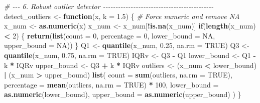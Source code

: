 \documentclass[
]{article}
\newenvironment{Shaded}{\begin{snugshade}}{\end{snugshade}}
\newcommand{\AttributeTok}[1]{\textcolor[rgb]{0.13,0.29,0.53}{#1}}
\newcommand{\CommentTok}[1]{\textcolor[rgb]{0.56,0.35,0.01}{\textit{#1}}}
\newcommand{\ConstantTok}[1]{\textcolor[rgb]{0.56,0.35,0.01}{#1}}
\newcommand{\ControlFlowTok}[1]{\textcolor[rgb]{0.13,0.29,0.53}{\textbf{#1}}}
\newcommand{\DecValTok}[1]{\textcolor[rgb]{0.00,0.00,0.81}{#1}}
\newcommand{\FloatTok}[1]{\textcolor[rgb]{0.00,0.00,0.81}{#1}}
\newcommand{\FunctionTok}[1]{\textcolor[rgb]{0.13,0.29,0.53}{\textbf{#1}}}
\newcommand{\NormalTok}[1]{#1}
\newcommand{\OtherTok}[1]{\textcolor[rgb]{0.56,0.35,0.01}{#1}}
\newcommand{\SpecialCharTok}[1]{\textcolor[rgb]{0.81,0.36,0.00}{\textbf{#1}}}
\begin{document}
\begin{Shaded}
\begin{Highlighting}[]
\CommentTok{\# {-}{-}{-} 6. Robust outlier detector {-}{-}{-}{-}{-}{-}{-}{-}{-}{-}{-}{-}{-}{-}{-}{-}{-}{-}{-}{-}{-}{-}{-}{-}{-}{-}{-}{-}{-}{-}{-}{-}{-}{-}{-}{-}{-}{-}{-}{-}{-}{-}{-}{-}}
\NormalTok{detect\_outliers }\OtherTok{\textless{}{-}} \ControlFlowTok{function}\NormalTok{(x, }\AttributeTok{k =} \FloatTok{1.5}\NormalTok{) \{}
  \CommentTok{\# Force numeric and remove NA}
\NormalTok{  x\_num }\OtherTok{\textless{}{-}} \FunctionTok{as.numeric}\NormalTok{(x)}
\NormalTok{  x\_num }\OtherTok{\textless{}{-}}\NormalTok{ x\_num[}\SpecialCharTok{!}\FunctionTok{is.na}\NormalTok{(x\_num)]}
  \ControlFlowTok{if}\NormalTok{(}\FunctionTok{length}\NormalTok{(x\_num) }\SpecialCharTok{\textless{}} \DecValTok{2}\NormalTok{) \{}
    \FunctionTok{return}\NormalTok{(}\FunctionTok{list}\NormalTok{(}\AttributeTok{count =} \DecValTok{0}\NormalTok{, }\AttributeTok{percentage =} \DecValTok{0}\NormalTok{, }\AttributeTok{lower\_bound =} \ConstantTok{NA}\NormalTok{, }\AttributeTok{upper\_bound =} \ConstantTok{NA}\NormalTok{))}
\NormalTok{  \}}
\NormalTok{  Q1 }\OtherTok{\textless{}{-}} \FunctionTok{quantile}\NormalTok{(x\_num, }\FloatTok{0.25}\NormalTok{, }\AttributeTok{na.rm =} \ConstantTok{TRUE}\NormalTok{)}
\NormalTok{  Q3 }\OtherTok{\textless{}{-}} \FunctionTok{quantile}\NormalTok{(x\_num, }\FloatTok{0.75}\NormalTok{, }\AttributeTok{na.rm =} \ConstantTok{TRUE}\NormalTok{)}
\NormalTok{  IQRv }\OtherTok{\textless{}{-}}\NormalTok{ Q3 }\SpecialCharTok{{-}}\NormalTok{ Q1}
\NormalTok{  lower\_bound }\OtherTok{\textless{}{-}}\NormalTok{ Q1 }\SpecialCharTok{{-}}\NormalTok{ k }\SpecialCharTok{*}\NormalTok{ IQRv}
\NormalTok{  upper\_bound }\OtherTok{\textless{}{-}}\NormalTok{ Q3 }\SpecialCharTok{+}\NormalTok{ k }\SpecialCharTok{*}\NormalTok{ IQRv}
\NormalTok{  outliers }\OtherTok{\textless{}{-}}\NormalTok{ (x\_num }\SpecialCharTok{\textless{}}\NormalTok{ lower\_bound) }\SpecialCharTok{|}\NormalTok{ (x\_num }\SpecialCharTok{\textgreater{}}\NormalTok{ upper\_bound)}
  \FunctionTok{list}\NormalTok{(}
    \AttributeTok{count =} \FunctionTok{sum}\NormalTok{(outliers, }\AttributeTok{na.rm =} \ConstantTok{TRUE}\NormalTok{),}
    \AttributeTok{percentage =} \FunctionTok{mean}\NormalTok{(outliers, }\AttributeTok{na.rm =} \ConstantTok{TRUE}\NormalTok{) }\SpecialCharTok{*} \DecValTok{100}\NormalTok{,}
    \AttributeTok{lower\_bound =} \FunctionTok{as.numeric}\NormalTok{(lower\_bound),}
    \AttributeTok{upper\_bound =} \FunctionTok{as.numeric}\NormalTok{(upper\_bound)}
\NormalTok{  )}
\NormalTok{\}}


\end{Highlighting}
\end{Shaded}
\end{document}
